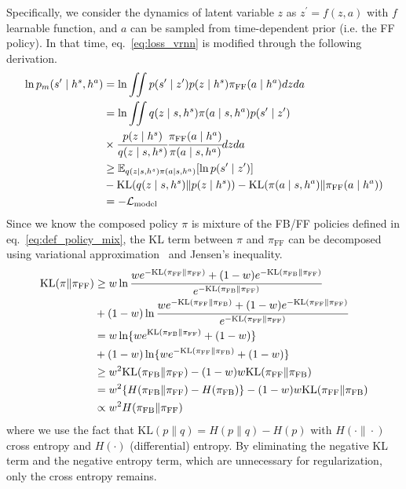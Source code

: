 \documentclass{bmcart}
\begin{document}
Specifically, we consider the dynamics of latent variable $z$ as $z^\prime = f(z, a)$ with $f$ learnable function, and $a$ can be sampled from time-dependent prior (i.e. the FF policy).
In that time, eq.~\eqref{eq:loss_vrnn} is modified through the following derivation.
\begin{align}
    \ln p_m(s^\prime \mid h^s, h^a) &= \ln \iint p(s^\prime \mid z^\prime) p(z \mid h^s) \pi_\mathrm{FF}(a \mid h^a) dz da
    \nonumber \\
    &= \ln \iint q(z \mid s, h^s) \pi(a \mid s, h^a) p(s^\prime \mid z^\prime)
    \nonumber \\
    &\times \cfrac{p(z \mid h^s)}{q(z \mid s, h^s)} \cfrac{\pi_\mathrm{FF}(a \mid h^a)}{\pi(a \mid s, h^a)} dz da
    \nonumber \\
    &\geq \mathbb{E}_{q(z \mid s, h^s) \pi(a \mid s, h^a)} [ \ln p(s^\prime \mid z^\prime) ]
    \nonumber \\
    &- \mathrm{KL}(q(z \mid s, h^s) \| p(z \mid h^s))
    - \mathrm{KL}(\pi(a \mid s, h^a) \| \pi_\mathrm{FF}(a \mid h^a))
    \nonumber \\
    &= - \mathcal{L}_\mathrm{model}
    \label{eq:loss_model}
\end{align}
Since we know the composed policy $\pi$ is mixture of the FB/FF policies defined in eq.~\eqref{eq:def_policy_mix}, the KL term between $\pi$ and $\pi_\mathrm{FF}$ can be decomposed using variational approximation~\cite{hershey2007approximating} and Jensen's inequality.
\begin{align}
    \mathrm{KL}(\pi \| \pi_\mathrm{FF}) &\geq w \ln \cfrac{w e^{-\mathrm{KL}(\pi_\mathrm{FF} \| \pi_\mathrm{FF})}
    + (1 - w) e^{-\mathrm{KL}(\pi_\mathrm{FB} \| \pi_\mathrm{FF})}}
    {e^{-\mathrm{KL}(\pi_\mathrm{FB} \| \pi_\mathrm{FF})}}
    \nonumber \\
    &+ (1 - w) \ln \cfrac{w e^{-\mathrm{KL}(\pi_\mathrm{FF} \| \pi_\mathrm{FB})}
    + (1 - w) e^{-\mathrm{KL}(\pi_\mathrm{FF} \| \pi_\mathrm{FF})}}
    {e^{-\mathrm{KL}(\pi_\mathrm{FF} \| \pi_\mathrm{FF})}}
    \nonumber \\
    &= w \ln \{ w e^{\mathrm{KL}(\pi_\mathrm{FB} \| \pi_\mathrm{FF})} + (1 - w) \}
    \nonumber \\
    &+ (1 - w) \ln \{ w e^{-\mathrm{KL}(\pi_\mathrm{FF} \| \pi_\mathrm{FB})} + (1 - w) \}
    \nonumber \\
    &\geq w^2 \mathrm{KL}(\pi_\mathrm{FB} \| \pi_\mathrm{FF})
    - (1 - w) w \mathrm{KL}(\pi_\mathrm{FF} \| \pi_\mathrm{FB})
    \nonumber \\
    &= w^2 \{H(\pi_\mathrm{FB} \| \pi_\mathrm{FF}) - H(\pi_\mathrm{FB})\}
    - (1 - w) w \mathrm{KL}(\pi_\mathrm{FF} \| \pi_\mathrm{FB})
    \nonumber \\
    &\propto w^2 H(\pi_\mathrm{FB} \| \pi_\mathrm{FF})
\end{align}
where we use the fact that $\mathrm{KL}(p \| q) = H(p \| q) - H(p)$ with $H(\cdot \| \cdot)$ cross entropy and $H(\cdot)$ (differential) entropy.
By eliminating the negative KL term and the negative entropy term, which are unnecessary for regularization, only the cross entropy remains.
\end{document}
